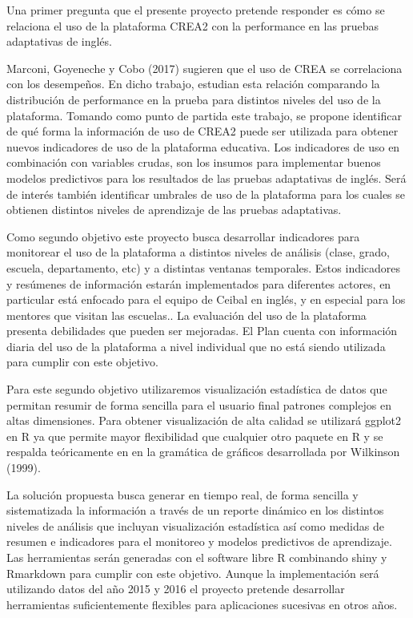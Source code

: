 \documentclass[msc,oneside,a4paper]{udelar}\usepackage[]{graphicx}\usepackage[]{color}
\begin{document}
Una primer pregunta que el presente proyecto pretende responder es cómo se relaciona el uso de la plataforma CREA2 con la performance en las pruebas adaptativas de inglés.

Marconi, Goyeneche y Cobo (2017) sugieren que el uso de CREA se correlaciona con los desempeños. En dicho trabajo, estudian esta relación comparando la distribución de performance en la prueba para distintos niveles del uso de la plataforma. Tomando como punto de partida este trabajo, se propone identificar de qué forma la información de uso de CREA2 puede ser utilizada para obtener nuevos indicadores de uso de la plataforma educativa. Los indicadores de uso en combinación con variables crudas, son los insumos para implementar buenos modelos predictivos para los resultados de las pruebas adaptativas de inglés. Será de interés también identificar umbrales de uso de la plataforma para los cuales se obtienen distintos niveles de aprendizaje de las pruebas adaptativas.

Como segundo objetivo este proyecto busca desarrollar indicadores para monitorear el uso de la plataforma a distintos niveles de análisis (clase, grado, escuela, departamento, etc) y a distintas ventanas temporales. Estos indicadores y resúmenes de información estarán implementados para diferentes actores, en particular está enfocado para el equipo de Ceibal en inglés, y en especial para los mentores que visitan las escuelas.. La evaluación del uso de la plataforma presenta debilidades que pueden ser mejoradas. El Plan cuenta con información diaria del uso de la plataforma a nivel individual que no está siendo utilizada para cumplir con este objetivo.

Para este segundo objetivo utilizaremos visualización estadística de datos que permitan resumir de forma sencilla para el usuario final patrones complejos en altas dimensiones. Para obtener visualización de alta calidad se utilizará ggplot2 en R ya que permite mayor flexibilidad que cualquier otro paquete en R y se respalda teóricamente en en la gramática de gráficos desarrollada por Wilkinson (1999).

La solución propuesta busca generar en tiempo real, de forma sencilla y sistematizada la información a través de un reporte dinámico en los distintos niveles de análisis que incluyan visualización estadística así como medidas de resumen e indicadores para el monitoreo y modelos predictivos de aprendizaje. Las herramientas serán generadas con
el software libre R combinando shiny y Rmarkdown para cumplir con este objetivo.
Aunque la implementación será utilizando datos del año 2015 y 2016 el proyecto pretende desarrollar herramientas suficientemente flexibles para aplicaciones sucesivas en otros años.
\end{document}
